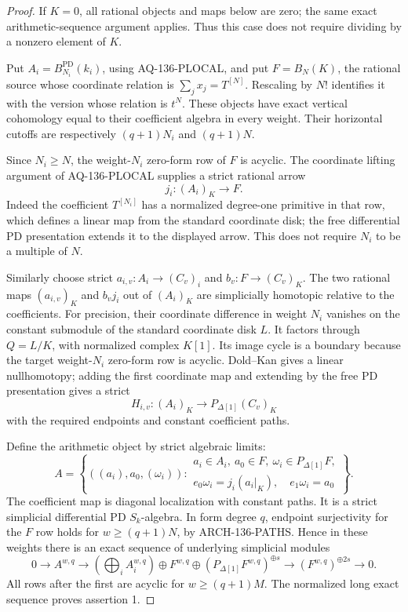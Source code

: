 \begin{proof}
If $K=0$, all rational objects and maps below are zero; the same
exact arithmetic-sequence argument applies.  Thus this case does
not require dividing by a nonzero element of $K$.

Put $A_i=B_{N_i}^{\mathrm{PD}}(k_i)$, using AQ-136-PLOCAL, and
put $F=B_N(K)$, the rational source whose coordinate relation is
$\sum_jx_j=T^{[N]}$.  Rescaling by $N!$ identifies it with the
version whose relation is $t^N$.  These objects have exact vertical
cohomology equal to their coefficient algebra in every weight.
Their horizontal cutoffs are respectively $(q+1)N_i$ and $(q+1)N$.

Since $N_i\geq N$, the weight-$N_i$ zero-form row of $F$ is
acyclic.  The coordinate lifting argument of AQ-136-PLOCAL supplies
a strict rational arrow
\[
                         j_i:(A_i)_K\longrightarrow F.
\]
Indeed the coefficient $T^{[N_i]}$ has a normalized degree-one
primitive in that row, which defines a linear map from the standard
coordinate disk; the free differential PD presentation extends it
to the displayed arrow.  This does not require $N_i$ to be a
multiple of $N$.

Similarly choose strict $a_{i,v}:A_i\to(C_v)_i$ and
$b_v:F\to(C_v)_K$.  The two rational maps
$(a_{i,v})_K$ and $b_vj_i$ out of $(A_i)_K$ are simplicially
homotopic relative to the coefficients.  For precision, their
coordinate difference in weight $N_i$ vanishes on the constant
submodule of the standard coordinate disk $L$.  It factors through
$Q=L/K$, with normalized complex $K[1]$.  Its image cycle is a
boundary because the target weight-$N_i$ zero-form row is acyclic.
Dold--Kan gives a linear nullhomotopy; adding the first coordinate
map and extending by the free PD presentation gives a strict
\[
 H_{i,v}:(A_i)_K\longrightarrow P_{\Delta[1]}(C_v)_K
\]
with the required endpoints and constant coefficient paths.

Define the arithmetic object by strict algebraic limits:
\[
 A=\left\{((a_i),a_0,(\omega_i)):
 \begin{array}{l}
 a_i\in A_i,\ a_0\in F,\ \omega_i\in P_{\Delta[1]}F,\\
 e_0\omega_i=j_i(a_i|_K),\quad e_1\omega_i=a_0
 \end{array}\right\}.
                                                        \tag{136.A1}
\]
The coefficient map is diagonal localization with constant paths.
It is a strict simplicial differential PD $S_k$-algebra.
In form degree $q$, endpoint surjectivity for the $F$ row holds
for $w\geq(q+1)N$, by ARCH-136-PATHS.  Hence in these weights
there is an exact sequence of underlying simplicial modules
\[
 0\to A^{w,q}\to
 \left(\bigoplus_iA_i^{w,q}\right)\oplus F^{w,q}
       \oplus(P_{\Delta[1]}F^{w,q})^{\oplus s}
 \to(F^{w,q})^{\oplus2s}\to0.                            \tag{136.A2}
\]
All rows after the first are acyclic for $w\geq(q+1)M$.
The normalized long exact sequence proves assertion 1.


\end{proof}
